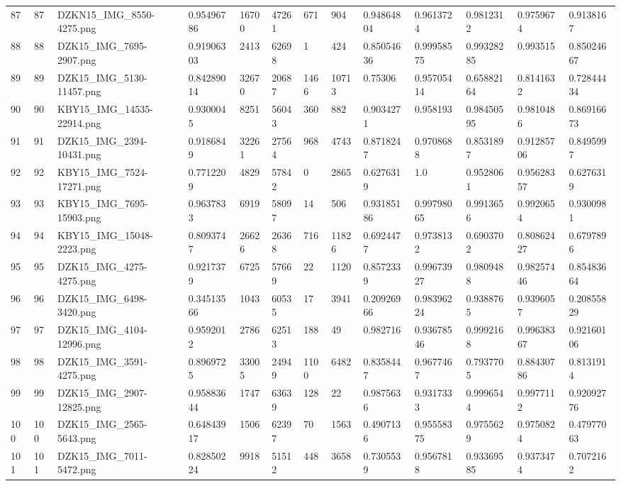 \documentclass[11pt, a4paper, twoside]{report}
\begin{document}
\begin{longtable}[c]{@{}lllllllllllll@{}}
87 & 87 & DZKN15\_IMG\_8550-4275.png & 0.95496786 & 16700 & 47261 & 671 & 904 & 0.94864804 & 0.9613724 & 0.9812312 & 0.9759674 & 0.9138167 \\
88 & 88 & DZK15\_IMG\_7695-2907.png & 0.91906303 & 2413 & 62698 & 1 & 424 & 0.85054636 & 0.99958575 & 0.99328285 & 0.993515 & 0.85024667 \\
89 & 89 & DZK15\_IMG\_5130-11457.png & 0.84289014 & 32670 & 20687 & 1466 & 10713 & 0.75306 & 0.95705414 & 0.65882164 & 0.8141632 & 0.72844434 \\
90 & 90 & KBY15\_IMG\_14535-22914.png & 0.9300045 & 8251 & 56043 & 360 & 882 & 0.9034271 & 0.958193 & 0.98450595 & 0.9810486 & 0.86916673 \\
91 & 91 & DZK15\_IMG\_2394-10431.png & 0.9186849 & 32261 & 27564 & 968 & 4743 & 0.8718247 & 0.9708688 & 0.8531897 & 0.91285706 & 0.8495997 \\
92 & 92 & KBY15\_IMG\_7524-17271.png & 0.7712209 & 4829 & 57842 & 0 & 2865 & 0.6276319 & 1.0 & 0.9528061 & 0.95628357 & 0.6276319 \\
93 & 93 & KBY15\_IMG\_7695-15903.png & 0.9637833 & 6919 & 58097 & 14 & 506 & 0.93185186 & 0.99798065 & 0.9913656 & 0.9920654 & 0.9300981 \\
94 & 94 & KBY15\_IMG\_15048-2223.png & 0.8093747 & 26626 & 26368 & 716 & 11826 & 0.6924477 & 0.9738132 & 0.6903702 & 0.80862427 & 0.6797896 \\
95 & 95 & DZK15\_IMG\_4275-4275.png & 0.9217379 & 6725 & 57669 & 22 & 1120 & 0.8572339 & 0.99673927 & 0.9809488 & 0.98257446 & 0.85483664 \\
96 & 96 & DZK15\_IMG\_6498-3420.png & 0.34513566 & 1043 & 60535 & 17 & 3941 & 0.20926966 & 0.98396224 & 0.9388765 & 0.9396057 & 0.20855829 \\
97 & 97 & DZK15\_IMG\_4104-12996.png & 0.9592012 & 2786 & 62513 & 188 & 49 & 0.982716 & 0.93678546 & 0.9992168 & 0.99638367 & 0.92160106 \\
98 & 98 & DZK15\_IMG\_3591-4275.png & 0.8969725 & 33005 & 24949 & 1100 & 6482 & 0.8358447 & 0.9677467 & 0.7937705 & 0.88430786 & 0.8131914 \\
99 & 99 & DZK15\_IMG\_2907-12825.png & 0.95883644 & 1747 & 63639 & 128 & 22 & 0.9875636 & 0.9317333 & 0.9996544 & 0.9977112 & 0.92092776 \\
100 & 100 & DZK15\_IMG\_2565-5643.png & 0.64843917 & 1506 & 62397 & 70 & 1563 & 0.4907136 & 0.95558375 & 0.9755629 & 0.9750824 & 0.47977063 \\
101 & 101 & DZK15\_IMG\_7011-5472.png & 0.82850224 & 9918 & 51512 & 448 & 3658 & 0.7305539 & 0.9567818 & 0.93369585 & 0.9373474 & 0.7072162 \\

\end{longtable}
\end{document}
